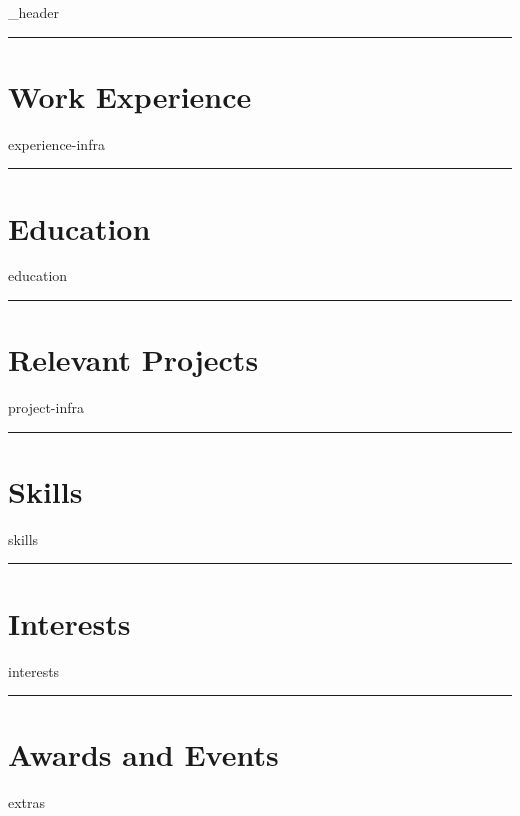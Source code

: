 \documentclass[letter,10pt]{article}
\author{Guilherme Lopes}
\begin{document}
{_header}
\vspace*{10pt}
\hrule
\vspace*{6pt}


\section{\textbf{Work Experience}}
\vspace*{3pt}
{experience-infra}
\vspace*{6pt}
\hrule

\section{\textbf{Education}}
\vspace*{3pt}
{education}
\vspace*{6pt}
\hrule
\vspace*{6pt}

\section{\textbf{Relevant Projects}}
\vspace*{3pt}
{project-infra}
\vspace*{6pt}
\hrule
\vspace*{6pt}

\section{\textbf{Skills}}
\vspace*{3pt}
{skills}
\vspace*{6pt}
\hrule

\section{\textbf{Interests}}
\vspace*{3pt}
{interests}
\vspace*{6pt}
\hrule

\section{\textbf{Awards and Events}}
\vspace*{3pt}
{extras}
\end{document}
